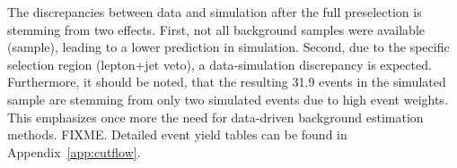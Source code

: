 The discrepancies between data and simulation after the full preselection is stemming from two effects.
First, not all background samples were available (\eg \ZInvJets sample), leading to a lower prediction in simulation.
Second, due to the specific selection region (lepton+jet veto), a data-simulation discrepancy is expected.
Furthermore, it should be noted, that the resulting 31.9 events in the simulated \WJets sample are stemming from only two simulated events due to high event weights.
This emphasizes once more the need for data-driven background estimation methods.
FIXME.
Detailed event yield tables can be found in Appendix~\ref{app:cutflow}.\\
\renewcommand{\arraystretch}{1.5}
\begin{table}
\centering
\caption{Event yields in simulation and data after the selections of each of the categories from Table~\ref{tab:SummaryCuts}}
\label{tab:CutflowALL}
\end{table}
